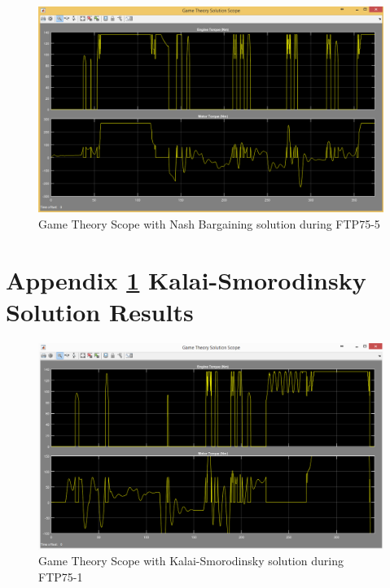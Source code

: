 \begin{figure}[h]
\centering
\includegraphics[scale=0.4]{figures/NashSolution/FTP75-5/gameTheory22Juni}
\caption{Game Theory Scope with Nash Bargaining solution during FTP75-5}
\label{fig:gtns5}
\end{figure}



\chapter{Appendix \ref{app:3} Kalai-Smorodinsky Solution Results}
\label{app:3}

\begin{figure}[h]
\centering
\includegraphics[scale=0.4]{figures/KalaiSmorodinsky/FTP75-1/gameTheory23Juni}
\caption{Game Theory Scope with Kalai-Smorodinsky solution during FTP75-1}
\label{fig:gtks1}
\end{figure}

